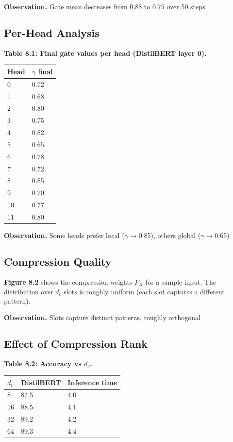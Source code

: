 \textbf{Observation.} Gate mean decreases from 0.88 to 0.75 over 50 steps

\subsection{Per-Head Analysis}

\textbf{Table 8.1: Final gate values per head (DistilBERT layer 0).}

\begin{table}[H]
\centering
\small
\begin{tabular}{ll}
\toprule
\textbf{Head} & \textbf{$\gamma$ final} \\
\midrule
0 & 0.72 \\
1 & 0.68 \\
2 & 0.80 \\
3 & 0.75 \\
4 & 0.82 \\
5 & 0.65 \\
6 & 0.78 \\
7 & 0.72 \\
8 & 0.85 \\
9 & 0.70 \\
10 & 0.77 \\
11 & 0.80 \\
\bottomrule
\end{tabular}
\end{table}

\textbf{Observation.} Some heads prefer local ($\gamma$$\rightarrow$0.85), others global ($\gamma$$\rightarrow$0.65)

\subsection{Compression Quality}

\textbf{Figure 8.2} shows the compression weights $P_K$ for a sample input. 
The distribution over $d_c$ slots is roughly uniform (each slot captures 
a different pattern).

\textbf{Observation.} Slots capture distinct patterns, roughly orthogonal

\subsection{Effect of Compression Rank}

\textbf{Table 8.2: Accuracy vs $d_c$.}

\begin{table}[H]
\centering
\small
\begin{tabular}{lll}
\toprule
\textbf{$d_c$} & \textbf{DistilBERT} & \textbf{Inference time} \\
\midrule
8 & 87.5 & 4.0 \\
16 & 88.5 & 4.1 \\
32 & 89.2 & 4.2 \\
64 & 89.3 & 4.4 \\
\bottomrule
\end{tabular}
\end{table}

